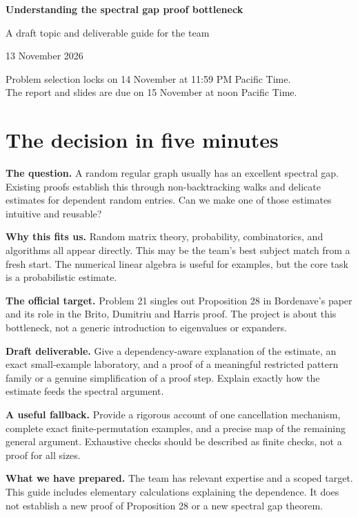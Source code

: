 \documentclass[11pt,letterpaper]{article}
\begin{document}
{\LARGE\bfseries Understanding the spectral gap proof bottleneck\par}
\vspace{0.4em}
{\large A draft topic and deliverable guide for the team\par}
13 November 2026\par
{\small Problem selection locks on 14 November at 11:59 PM Pacific Time.\\
The report and slides are due on 15 November at noon Pacific Time.\par}
\vspace{0.6em}

\section*{The decision in five minutes}
\textbf{The question.} A random regular graph usually has an excellent spectral gap. Existing proofs establish this through non-backtracking walks and delicate estimates for dependent random entries. Can we make one of those estimates intuitive and reusable?

\textbf{Why this fits us.} Random matrix theory, probability, combinatorics, and algorithms all appear directly. This may be the team's best subject match from a fresh start. The numerical linear algebra is useful for examples, but the core task is a probabilistic estimate.

\textbf{The official target.} Problem 21 singles out Proposition 28 in Bordenave's paper and its role in the Brito, Dumitriu and Harris proof. The project is about this bottleneck, not a generic introduction to eigenvalues or expanders.

\textbf{Draft deliverable.} Give a dependency-aware explanation of the estimate, an exact small-example laboratory, and a proof of a meaningful restricted pattern family or a genuine simplification of a proof step. Explain exactly how the estimate feeds the spectral argument.

\textbf{A useful fallback.} Provide a rigorous account of one cancellation mechanism, complete exact finite-permutation examples, and a precise map of the remaining general argument. Exhaustive checks should be described as finite checks, not a proof for all sizes.

\textbf{What we have prepared.} The team has relevant expertise and a scoped target. This guide includes elementary calculations explaining the dependence. It does not establish a new proof of Proposition 28 or a new spectral gap theorem.
\end{document}
